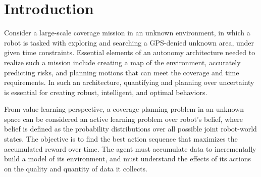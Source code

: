 \documentclass{article}
\newcommand{\ph}[1]{{\textbf{#1}:}} %
\begin{document}







\section{Introduction}

Consider a large-scale coverage mission in an unknown environment, in which a robot is tasked with exploring and searching a GPS-denied unknown area, under given time constraints. Essential elements of an autonomy architecture needed to realize such a mission include creating a map of the environment, accurately predicting risks, and planning motions that can meet the coverage and time requirements.  In such an architecture, quantifying and planning over uncertainty is essential for creating robust, intelligent, and optimal behaviors.

From value learning perspective, a coverage planning problem in an unknown space can be considered an active learning problem over robot's belief, where belief is defined as the probability distributions over all possible joint robot-world states.
%
The objective is to find the best action sequence that maximizes the accumulated reward over time.  The agent must accumulate data to incrementally build a model of its environment, and must understand the effects of its actions on the quality and quantity of data it collects.
\end{document}
